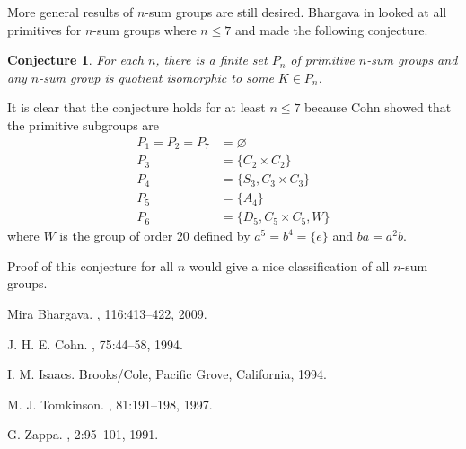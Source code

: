 \documentclass[12pt]{amsart}
\newtheorem{conjecture}[theorem]{Conjecture}
\theoremstyle{definition}
\theoremstyle{remark}
\renewcommand{\emptyset}{\varnothing}
\begin{document}
More general results of \( n \)-sum groups are still desired.  Bhargava in \cite{MiBh09} looked at all primitives for \(n\)-sum groups where \( n \leq 7 \) and made the following conjecture.

\begin{conjecture}
For each \( n \), there is a finite set \( P_n \) of primitive \(n\)-sum groups and any \( n \)-sum group is quotient isomorphic to some \( K \in P_n \).
\end{conjecture}

\begin{comment}
\begin{conjecture}
For any positive integer \( n \), there exists a minimal, finite set \( I_n \) of \(n\)-sum groups such that \( G \) is quotient isomorphic to some group \( K \in I_n \) if and only if \( \sigma(G) = n \).
\end{conjecture}
\end{comment}

It is clear that the conjecture holds for at least \( n \leq 7 \) because Cohn showed that the primitive subgroups are
\begin{align*}
P_1 = P_2 = P_7 &= \emptyset\\
P_3 &= \{ C_2 \times C_2 \}\\
P_4 &= \{ S_3, C_3 \times C_3 \}\\
P_5 &= \{ A_4 \}\\
P_6 &= \{ D_5, C_5 \times C_5, W \}
\end{align*}
where \( W \) is the group of order \( 20 \) defined by \( a^5 = b^4 = \{ e \} \) and \( ba = a^2b \).

Proof of this conjecture for all \( n \) would give a nice classification of all \(n\)-sum groups.


\begin{thebibliography}{10}

Mira Bhargava.
, 116:413--422, 2009.

J. H. E. Cohn.
, 75:44--58, 1994.

I. M. Isaacs.
\newblock Brooks/Cole, Pacific Grove, California, 1994.

M. J. Tomkinson.
, 81:191--198, 1997.

G. Zappa.
, 2:95--101, 1991.

\end{thebibliography}
 
\end{document}
